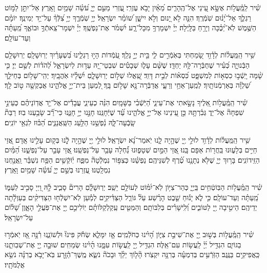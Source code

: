 \documentclass[twoside, openany, parskip=half, 11pt]{book}
\begin{document}
שִׁ֗יר לַֽמַּֽ֫עֲל֥וֹת אֶשָּׂ֣א עֵ֭ינַי אֶל־הֶֽהָרִ֑ים מֵ֝אַ֗יִן יָבֹ֥א עֶזְרִֽי׃ עֶ֭זְרִי מֵעִ֣ם יְיָ֑ עֹ֝שֵׂ֗ה שָׁמַ֥יִם וָאָֽרֶץ׃ אַל־יִתֵּ֣ן לַמּ֣וֹט רַגְלֶ֑ךָ אַל־יָ֝נ֗וּם שֹֽׁמְֿרֶֽךָ׃ הִנֵּ֤ה לֹ֣א יָ֭נוּם וְלֹ֣א יִישָׁ֑ן שׁ֝וֹמֵ֗ר יִשְׂרָאֵֽל׃ יְיָ֥ שֹֽׁמְֿרֶ֑ךָ יְיָ֥ צִ֝לְּֿךָ֗ עַל־יַ֥ד יְמִינֶֽךָ׃ יוֹמָ֗ם הַשֶּׁ֥מֶשׁ לֹֽא־יַ֝כֶּ֗כָּה וְיָרֵ֥חַ בַּלָּֽיְלָה׃ יְיָ֗ יִשְׁמָרְךָ֥ מִכָּל־רָ֑ע יִ֝שְׁמֹ֗ר אֶת־נַפְשֶֽׁךָ׃ יְיָ֗ יִשְׁמָר־צֵֽאתְֿךָ֥ וּבוֹאֶ֑ךָ מֵֽ֝עַתָּ֗ה וְעַד־עוֹלָֽם׃

שִׁ֥יר הַֽמַּֽעֲל֗וֹת לְדָ֫וִ֥ד שָׂ֭מַחְתִּי בְּאֹֽמְֿרִ֣ים לִ֑י בֵּ֖ית יְיָ֣ נֵלֵֽךְ׃ עֹֽ֭מְֿדוֹת הָי֣וּ רַגְלֵ֑ינוּ בִּ֝שְׁעָרַ֗יִךְ יְרֽוּשָׁלָֽםִ׃ יְרֽוּשָׁלַ֥םִ הַבְּֿנוּיָ֑ה כְּ֝עִ֗יר שֶׁחֻבְּֿרָה־לָּ֥הּ יַחְדָּֽו׃ שֶׁשָּׁ֨ם עָל֢וּ שְׁבָטִ֡ים שִׁבְטֵי־יָ֭הּ עֵד֣וּת לְיִשְׂרָאֵ֑ל לְ֝הֹד֗וֹת לְשֵׁ֣ם יְיָ׃ כִּ֤י שָׁ֨מָּה יָֽשְֿׁב֣וּ כִסְא֣וֹת לְמִשְׁפָּ֑ט כִּ֝סְא֗וֹת לְבֵ֣ית דָּוִֽד׃ שַֽׁ֭אֲלוּ שְׁל֣וֹם יְרֽוּשָׁלָ֑םִ יִ֝שְׁלָ֗יוּ אֹֽהֲבָֽיִךְ׃ יְהִֽי־שָׁל֥וֹם בְּחֵילֵ֑ךְ שַׁ֝לְוָ֗ה בְּאַרְמְֿנוֹתָֽיִךְ׃ לְמַֽעַן־אַחַ֥י וְרֵעָ֑י אֲדַבְּֿרָה־נָּ֖א שָׁל֣וֹם בָּֽךְ׃ לְ֭מַעַן בֵּית־יְיָ֣ אֱלֹהֵ֑ינוּ אֲבַקְשָׁ֖ה ט֣וֹב לָֽךְ׃

 שִׁ֗יר הַֽמַּֽ֫עֲל֥וֹת אֵ֭לֶיךָ נָשָׂ֣אתִי אֶת־עֵינַ֑י הַ֝יֹּֽשְֿׁבִ֗י בַּשָּׁמָֽיִם׃ הִנֵּ֨ה כְעֵינֵ֢י עֲבָדִ֡ים אֶל־יַ֤ד אֲדֽוֹנֵיהֶ֗ם כְּעֵינֵ֣י שִׁפְחָה֘ אֶל־יַד֢ גְּבִ֫רְתָּ֥הּ כֵּ֣ן עֵ֭ינֵינוּ אֶל־יְיָ֣ אֱלֹהֵ֑ינוּ עַ֝֗ד שֶׁיְּֿחָנֵּֽנוּ׃ חָנֵּ֣נוּ יְיָ֣ חָנֵּ֑נוּ כִּי־רַ֝֗ב שָׂבַ֥עְנוּ בֽוּז׃ רַבַּת֘ שָֽׂבְֿעָה־לָּ֢הּ נַ֫פְשֵׁ֥נוּ הַלַּ֥עַג הַשַּֽׁאֲנַנִּ֑ים הַ֝בּ֗וּז לִגְאֵ֥י יוֹנִֽים׃


שִׁ֥יר הַֽמַּֽעֲל֗וֹת לְדָ֫וִ֥ד לוּלֵ֣י יְ֖יָ שֶׁהָ֣יָה לָ֑נוּ יֹֽאמַר־נָ֝א יִשְׂרָאֵֽל׃ לוּלֵ֣י יְ֖יָ שֶׁהָ֣יָה לָֿ֑נוּ בְּק֖וּם עָלֵ֣ינוּ אָֽדָם׃ אֲ֭זַי חַיִּ֣ים בְּלָע֑וּנוּ בַּֽחֲר֖וֹת אַפָּם בָּֽנוּ׃ אֲ֭זַי הַמַּ֣יִם שְׁטָפ֑וּנוּ נַ֝֗חְלָה עָבַ֥ר עַל־נַפְשֵֽׁנוּ׃ אֲ֭זַי עָבַ֣ר עַל־נַפְשֵׁ֑נוּ הַ֝מַּ֗יִם הַזֵּֽידוֹנִֽים׃ בָּר֥וּךְ יְיָ֑ שֶׁלֹּ֖א נְתָנָ֥נוּ טֶ֝֗רֶף לְשִׁנֵּיהֶֽם׃ נַפְשֵׁ֗נוּ כְּצִפּ֥וֹר נִמְלְֿטָה֘ מִפַּ֢ח יֽ֫וֹקְֿשִׁ֥ים הַפַּ֥ח נִשְׁבַּ֗ר וַֽאֲנַ֥חְנוּ נִמְלָֽטְנוּ׃ עֶ֭זְרֵנוּ בְּשֵׁ֣ם יְיָ֑ עֹ֝שֵׂ֗ה שָׁמַ֥יִם וָאָֽרֶץ׃

 שִׁ֗יר הַֽמַּֽ֫עֲל֥וֹת הַבּֽוֹטְֿחִ֥ים בַּֽיְיָ֑ כְּהַר־צִיּ֥וֹן לֹֽא־יִ֝מּ֗וֹט לְעוֹלָ֥ם יֵשֵֽׁב׃ יְרְוּשָׁלְַ֗םִ הָרִים֘ סָבִ֢יב לָ֥֫הּ וַ֭יְיָ סָבִ֣יב לְעַמּ֑וֹ מֵֽ֝עַתָּ֗ה וְעַד־עוֹלָֽם׃ כִּ֤י לֹ֢א יָנ֡וּחַ שֵׁ֤בֶט הָרֶ֗שַׁע עַל֘ גּוֹרַ֢ל הַצַּדִּ֫יקִ֥ים לְמַ֡עַן לֹֽא־יִשְׁלְֿח֖וּ הַצַּדִּיקִ֨ים בְּעַוְלָ֬תָה יְדֵיהֶֽם׃ הֵיטִ֣יבָה יְ֖יָ לַטּוֹבִ֑ים וְ֝לִֽישָׁרִ֗ים בְּלִבּוֹתָֽם׃ וְהַמַּטִּ֤ים עַֽקַלְקַלּוֹתָ֗ם יֽוֹלִיכֵ֣ם יְ֖יָ אֶת־פֹּֽעֲלֵ֣י הָאָ֑וֶן שָׁ֝ל֗וֹם עַל־יִשְׂרָאֵֽל׃

שִׁ֗יר הַֽמַּֽ֫עֲל֥וֹת בְּשׁ֣וּב יְ֖יָ אֶת־שִׁיבַ֣ת צִיּ֑וֹן הָ֝יִ֗ינוּ כְּחֹלְֿמִֽים׃ אָ֤ז יִמָּלֵ֢א שְׂחֹ֡ק פִּינוּ֘ וּלְשׁוֹנֵ֢נוּ רִ֫נָּ֥ה אָ֭ז יֹֽאמְֿר֣וּ בַגּוֹיִ֑ם הִגְדִּ֥יל יְ֜יָ֗ לַֽעֲשׂ֥וֹת עִם־אֵֽלֶּה׃ הִגְדִּ֥יל יְ֖יָ לַֽעֲשׂ֣וֹת עִמָּ֑נוּ הָ֜יִ֗ינוּ שְׂמֵחִֽים׃ שׁוּבָ֣ה יְ֖יָ אֶת־שְׁבִותֵ֑נוּ כַּֽאֲפִיקִ֥ים בַּנֶּֽגֶב׃ הַזֹּֽרְֿעִ֥ים בְּדִמְעָ֗ה בְּרִנָּ֥ה יִקְצֹֽרוּ׃ הָ֘ל֤וֹךְ יֵלֵ֨ךְ וּבָכֹה֘ נֹשֵׂ֢א מֶֽשֶׁךְ־הַ֫זָּ֥רַע בֹּֽא־יָבֹ֥א בְרִנָּ֗ה נֹשֵׂ֥א אֲלֻמֹּתָֽיו׃
 
\end{document}
